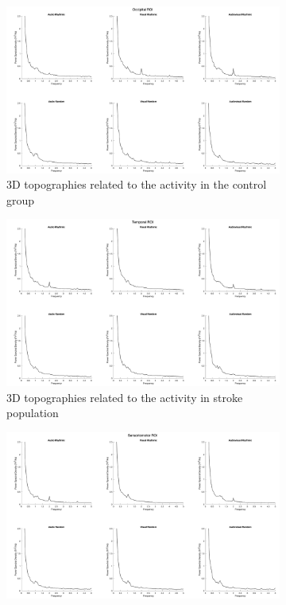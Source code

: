 \begin{figure}[htbp]
    \begin{subfigure}[htbp]{0.45\textwidth}
        \includegraphics[width=\textwidth]{healthy_images/occipitalROI_graph.png}
        \caption{3D topographies related to the activity in the control group}
        \label{fig: Waveforms control: occipital} 
    \end{subfigure}  
    \hfill
    \begin{subfigure}[htbp]{0.45\textwidth}
        \includegraphics[width=\textwidth]{healthy_images/temporalROI_graph.png}
        \caption{3D topographies related to the activity in stroke population}
        \label{fig: Waveforms control: temporal}   
    \end{subfigure}
    \hfill
    \begin{subfigure}[htbp]{0.45\textwidth}
        \includegraphics[width=\textwidth]{healthy_images/sensorimotorROI_graph.png}

\end{subfigure}
\end{figure}
